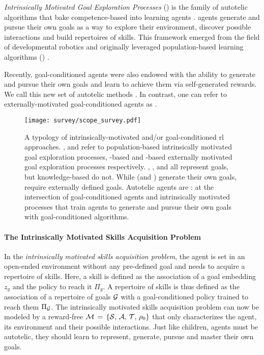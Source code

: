\textit{Intrinsically Motivated Goal Exploration Processes} (\imgep) is the family of autotelic algorithms that bake competence-based \ims into learning agents \citep{imgep}. \imgep agents generate and pursue their own goals as a way to explore their environment, discover possible interactions and build repertoires of skills. This framework emerged from the field of developmental robotics \citep{oudeyer2007intrinsic,baranes2009proximo,baranes2010intrinsically,rolf2010goal} and originally leveraged population-based learning algorithms (\popimgep) \citep{baranes2009r,baranes2013active,forestier2016modular,imgep}. 

Recently, goal-conditioned \rl agents were also endowed with the ability to generate and pursue their own goals and learn to achieve them via self-generated rewards. We call this new set of autotelic methods \rlimgeps. In contrast, one can refer to externally-motivated goal-conditioned \rl agents as \rlemgeps.

\begin{figure}[!h]
\centering
\texttt{[image: survey/scope\_survey.pdf]}
\caption{A typology of intrinsically-motivated and/or goal-conditioned rl approaches. \popimgep, \rlimgep and \rlemgep refer to population-based intrinsically motivated goal exploration processes, \rl-based \imgep and \rl-based externally motivated goal exploration processes respectively. \popimgep, \rlimgep, and \rlemgep all represent goals, but knowledge-based \ims do not. While \imgeps (\popimgep and \rlimgep) generate their own goals, \rlemgeps require externally defined goals. Autotelic agents are \rlimgep: at the intersection of goal-conditioned \rl agents and intrinsically motivated processes that train agents to generate and pursue their own goals with goal-conditioned \rl algorithms.}	
\end{figure}

\paragraph{The Intrinsically Motivated Skills Acquisition Problem}

In the \textit{intrinsically motivated skills acquisition problem}, the agent is set in an open-ended environment without any pre-defined goal and needs to acquire a repertoire of skills. Here, a skill is defined as the association of a goal embedding $z_g$ and the policy to reach it $\Pi_g$. A repertoire of skills is thus defined as the association of a repertoire of goals $\mathcal{G}$ with a goal-conditioned policy trained to reach them $\Pi_{\mathcal{G}}$. The intrinsically motivated skills acquisition problem can now be modeled by a reward-free \mdp $\mathcal{M}\,=\,\{\mathcal{S},\, \mathcal{A},\, \mathcal{T},\, \rho_0\}$ that only characterizes the agent, its environment and their possible interactions. Just like children, agents must be autotelic, \ie they should learn to represent, generate, pursue and master their own goals.

